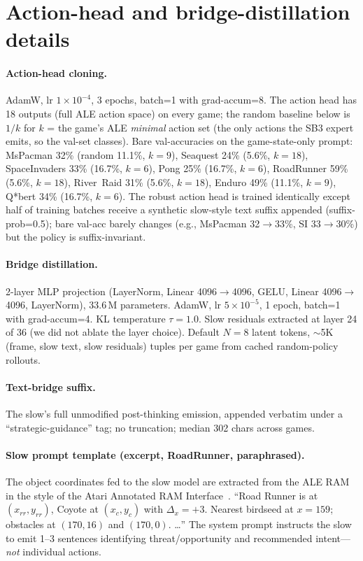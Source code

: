 \documentclass[11pt]{article}
\begin{document}
\section{Action-head and bridge-distillation details}
\label{app:training}

\paragraph{Action-head cloning.} AdamW, lr $1\!\times\!10^{-4}$, 3 epochs, batch=1 with grad-accum=8. The action
head has 18 outputs (full ALE action space) on every game; the random baseline below is $1/k$ for
$k$ = the game's ALE \emph{minimal} action set (the only actions the SB3 expert emits, so the
val-set classes). Bare val-accuracies on the game-state-only prompt: MsPacman 32\% (random 11.1\%,
$k\!=\!9$), Seaquest 24\% (5.6\%, $k\!=\!18$), SpaceInvaders 33\% (16.7\%, $k\!=\!6$), Pong 25\%
(16.7\%, $k\!=\!6$), RoadRunner 59\% (5.6\%, $k\!=\!18$), River~Raid 31\% (5.6\%, $k\!=\!18$),
Enduro 49\% (11.1\%, $k\!=\!9$), Q*bert 34\% (16.7\%, $k\!=\!6$). The robust action head is trained identically except
half of training batches receive a synthetic slow-style text suffix appended (suffix-prob=0.5);
bare val-acc barely changes (e.g., MsPacman 32$\to$33\%, SI 33$\to$30\%) but the policy is
suffix-invariant.

\paragraph{Bridge distillation.} 2-layer MLP projection (LayerNorm, Linear 4096$\to$4096, GELU, Linear 4096$\to$4096, LayerNorm), 33.6\,M parameters. AdamW, lr $5\!\times\!10^{-5}$, 1 epoch, batch=1 with grad-accum=4. KL temperature $\tau=1.0$. Slow residuals extracted at layer 24 of 36 (we did not ablate the layer choice). Default $N=8$ latent tokens, $\sim$5K (frame, slow text, slow residuals) tuples per game from cached random-policy rollouts.

\paragraph{Text-bridge suffix.} The slow's full unmodified post-thinking emission, appended verbatim under a ``strategic-guidance'' tag; no truncation; median 302 chars across games.

\paragraph{Slow prompt template (excerpt, RoadRunner, paraphrased).}
The object coordinates fed to the slow model are extracted from the ALE RAM in the style of the
Atari Annotated RAM Interface~\cite{atariari}.
``Road Runner is at $(x_{rr}, y_{rr})$, Coyote at $(x_c, y_c)$ with $\Delta_x={+}3$. Nearest birdseed at $x=159$; obstacles at $(170,16)$ and $(170,0)$. \dots'' The system prompt instructs the slow to emit 1--3 sentences identifying threat/opportunity and recommended intent---\emph{not} individual actions.
\end{document}

